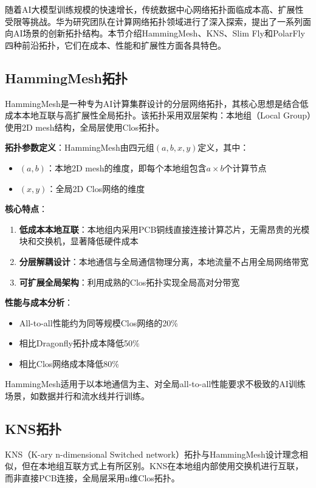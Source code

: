 随着AI大模型训练规模的快速增长，传统数据中心网络拓扑面临成本高、扩展性受限等挑战。华为研究团队在计算网络拓扑领域进行了深入探索，提出了一系列面向AI场景的创新拓扑结构。本节介绍HammingMesh、KNS、Slim Fly和PolarFly四种前沿拓扑，它们在成本、性能和扩展性方面各具特色。

\subsection{HammingMesh拓扑}

HammingMesh是一种专为AI计算集群设计的分层网络拓扑，其核心思想是结合低成本本地互联与高扩展性全局拓扑。该拓扑采用双层架构：本地组（Local Group）使用2D mesh结构，全局层使用Clos拓扑。

\textbf{拓扑参数定义}：HammingMesh由四元组$(a,b,x,y)$定义，其中：
\begin{itemize}
    \item $(a,b)$：本地2D mesh的维度，即每个本地组包含$a \times b$个计算节点
    \item $(x,y)$：全局2D Clos网络的维度
\end{itemize}

\textbf{核心特点}：
\begin{enumerate}
    \item \textbf{低成本本地互联}：本地组内采用PCB铜线直接连接计算芯片，无需昂贵的光模块和交换机，显著降低硬件成本
    \item \textbf{分层解耦设计}：本地通信与全局通信物理分离，本地流量不占用全局网络带宽
    \item \textbf{可扩展全局架构}：利用成熟的Clos拓扑实现全局高对分带宽
\end{enumerate}

\textbf{性能与成本分析}：
\begin{itemize}
    \item All-to-all性能约为同等规模Clos网络的20\%
    \item 相比Dragonfly拓扑成本降低50\%
    \item 相比Clos网络成本降低80\%
\end{itemize}

HammingMesh适用于以本地通信为主、对全局all-to-all性能要求不极致的AI训练场景，如数据并行和流水线并行训练。

\subsection{KNS拓扑}

KNS（K-ary n-dimensional Switched network）拓扑与HammingMesh设计理念相似，但在本地组互联方式上有所区别。KNS在本地组内部使用交换机进行互联，而非直接PCB连接，全局层采用n维Clos拓扑。

